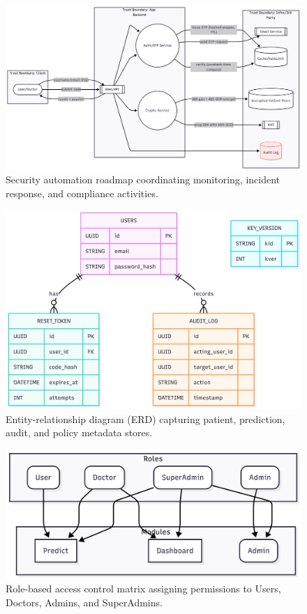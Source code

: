 \documentclass[conference]{IEEEtran}
\begin{document}
\begin{figure}[t]
  \centering
  \includegraphics[width=0.9\linewidth]{sa.png}
  \caption{Security automation roadmap coordinating monitoring, incident response, and compliance activities.}
  \label{fig:security_automation}
\end{figure}

\begin{figure}[t]
  \centering
  \includegraphics[width=0.9\linewidth]{database_erd.png}
  \caption{Entity-relationship diagram (ERD) capturing patient, prediction, audit, and policy metadata stores.}
  \label{fig:database_erd}
\end{figure}

\begin{figure}[t]
  \centering
  \includegraphics[width=0.85\linewidth]{role_based_access_control_rbac.png}
  \caption{Role-based access control matrix assigning permissions to Users, Doctors, Admins, and SuperAdmins.}
  \label{fig:rbac}
\end{figure}
\end{document}
